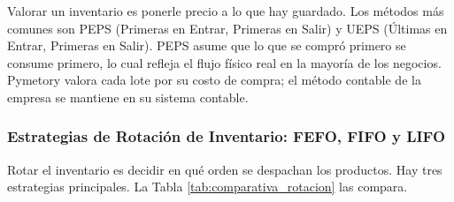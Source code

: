 Valorar un inventario es ponerle precio a lo que hay guardado. Los métodos más comunes son PEPS (Primeras en Entrar, Primeras en Salir) y UEPS (Últimas en Entrar, Primeras en Salir). PEPS asume que lo que se compró primero se consume primero, lo cual refleja el flujo físico real en la mayoría de los negocios. Pymetory valora cada lote por su costo de compra; el método contable de la empresa se mantiene en su sistema contable.

\subsubsection{Estrategias de Rotación de Inventario: FEFO, FIFO y LIFO}
\label{sssec:fefo_fifo_lifo}

Rotar el inventario es decidir en qué orden se despachan los productos. Hay tres estrategias principales. La Tabla \ref{tab:comparativa_rotacion} las compara.

